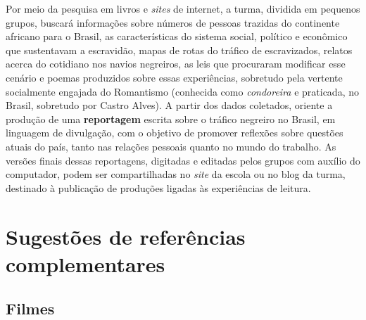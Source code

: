 \documentclass[11pt]{extarticle}
\begin{document}
  Por meio da pesquisa em livros e \emph{sites} de internet, a turma,
  dividida em pequenos grupos, buscará informações sobre números de
  pessoas trazidas do continente africano para o Brasil, as
  características do sistema social, político e econômico que
  sustentavam a escravidão, mapas de rotas do tráfico de escravizados,
  relatos acerca do cotidiano nos navios negreiros, as leis que
  procuraram modificar esse cenário e poemas produzidos sobre essas
  experiências, sobretudo pela vertente socialmente engajada do
  Romantismo (conhecida como \emph{condoreira} e praticada, no Brasil,
  sobretudo por Castro Alves). A partir dos dados coletados, oriente a
  produção de uma \textbf{reportagem} escrita sobre o tráfico negreiro
  no Brasil, em linguagem de divulgação, com o objetivo de promover
  reflexões sobre questões atuais do país, tanto nas relações pessoais
  quanto no mundo do trabalho. As versões finais dessas reportagens,
  digitadas e editadas pelos grupos com auxílio do computador, podem ser
  compartilhadas no \emph{site} da escola ou no blog da turma, destinado
  à publicação de produções ligadas às experiências de leitura.



\section{Sugestões de referências complementares}\label{sugestoes}


\subsection{Filmes}
\end{document}
